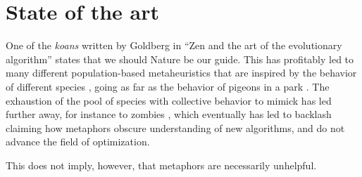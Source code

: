 \section{State of the art}

One of the {\em koans} written by Goldberg in ``Zen and the art of the
evolutionary algorithm'' states that we should Nature be our guide. This has
profitably led to many different population-based metaheuristics that are
inspired by the behavior of different species \cite{nedjah2020inspiration}, going as far as the behavior of
pigeons in a park \cite{blanco2019urban}. The exhaustion of the pool of
species with collective behavior to mimick has led further away, for instance to
zombies \cite{nguyen2012zombie}, which eventually has led to backlash
\cite{metaphor_exposed} claiming how metaphors obscure understanding of new
algorithms, and do not advance the field of optimization.

This does not imply, however, that metaphors are necessarily unhelpful.


